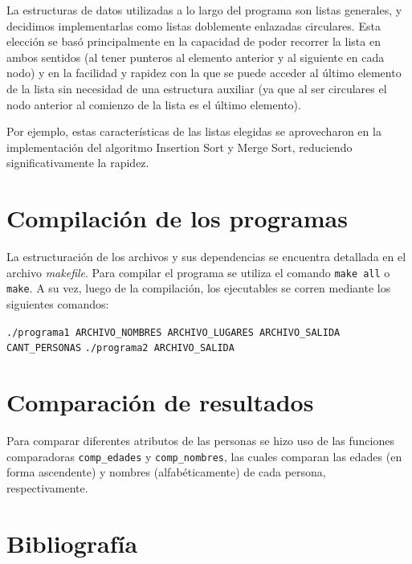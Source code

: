 \documentclass[12pt, a4paper, twoside]{article}
\begin{document}
La estructuras de datos utilizadas a lo largo del programa son listas generales, y decidimos implementarlas como listas doblemente enlazadas circulares. Esta elección se basó principalmente en la capacidad de poder recorrer la lista en ambos sentidos (al tener punteros al elemento anterior y al siguiente en cada nodo) y en la facilidad y rapidez con la que se puede acceder al último elemento de la lista sin necesidad de una estructura auxiliar (ya que al ser circulares el nodo anterior al comienzo de la lista es el último elemento).\par

Por ejemplo, estas características de las listas elegidas se aprovecharon en la implementación del algoritmo Insertion Sort y Merge Sort, reduciendo significativamente la rapidez.\par

\section{Compilación de los programas}

La estructuración de los archivos y sus dependencias se encuentra detallada en el archivo \textit{makefile}. Para compilar el programa se utiliza el comando \verb|make all| o \verb|make|. A su vez, luego de la compilación, los ejecutables se corren mediante los siguientes comandos:\par

\noindent \verb|./programa1 ARCHIVO_NOMBRES ARCHIVO_LUGARES ARCHIVO_SALIDA CANT_PERSONAS| \newline
\noindent \verb|./programa2 ARCHIVO_SALIDA|\par


\section{Comparación de resultados}

Para comparar diferentes atributos de las personas se hizo uso de las funciones comparadoras \verb|comp_edades| y \verb|comp_nombres|, las cuales comparan las edades (en forma ascendente) y nombres (alfabéticamente) de cada persona, respectivamente.

\section{Bibliografía}
\end{document}
